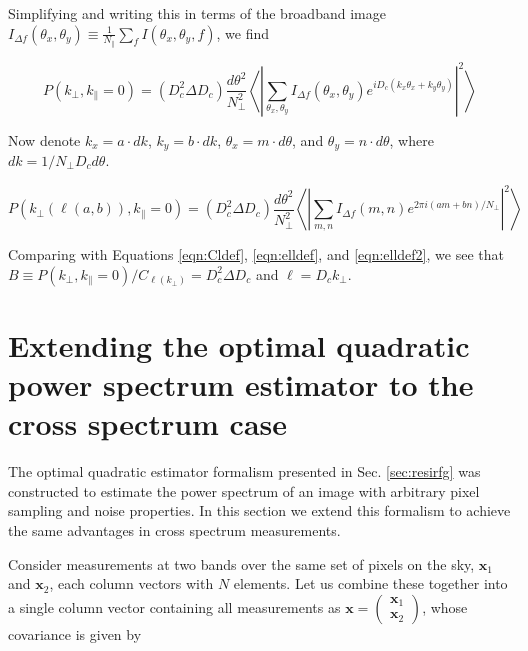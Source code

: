 \documentclass[numberedappendix]{emulateapj}
\newcommand{\xb}{\mathbf{x}}
\begin{document}
Simplifying and writing this in terms of the broadband image $I_{\Delta f}(\theta_x,\theta_y)\equiv\frac{1}{N_\parallel}\sum_f  I(\theta_x,\theta_y,f)$, we find

\begin{equation}
P(k_\perp,k_\parallel=0) =(D_c^2 \Delta D_c)
\frac{d\theta^2}{N_\perp^2}\left\langle\left|\sum_{\theta_x,\theta_y}I_{\Delta f}(\theta_x,\theta_y)e^{iD_c(k_x\theta_x+k_y\theta_y)}\right|^2\right\rangle
\end{equation}

Now denote $k_x=a\cdot dk$, $k_y=b\cdot dk$, $\theta_x=m\cdot d\theta$, and $\theta_y=n\cdot d\theta$, where $dk = 1/N_\perp D_c d\theta$. 

\begin{equation}
P(k_\perp(\ell(a,b)),k_\parallel=0) =(D_c^2 \Delta D_c)
\frac{d\theta^2}{N_\perp^2}\left\langle\left|\sum_{m,n}I_{\Delta f}(m,n)e^{2\pi i(am + bn)/N_\perp}\right|^2\right\rangle
\end{equation}

Comparing with Equations \ref{eqn:Cldef}, \ref{eqn:elldef}, and \ref{eqn:elldef2}, we see that $B\equiv P(k_\perp,k_\parallel=0)/ C_{\ell(k_\perp)}=D_c^2 \Delta D_c$ and $\ell=D_c k_\perp$.


\section{Extending the optimal quadratic power spectrum estimator to the cross spectrum case}
\label{sec:optimalestimatorforcrossspectrum}

The optimal quadratic estimator formalism presented in Sec. \ref{sec:resirfg} was constructed to estimate the power spectrum of an image with arbitrary pixel sampling and noise properties. In this section we extend this formalism to achieve the same advantages in cross spectrum measurements. 

Consider measurements at two bands over the same set of pixels on the sky, $\xb_1$ and $\xb_2$, each column vectors with $N$ elements. Let us combine these together into a single column vector containing all measurements as $\xb=\left(\begin{matrix}\xb_1 \\ \xb_2  \end{matrix}\right)$, whose covariance is given by 
\end{document}
